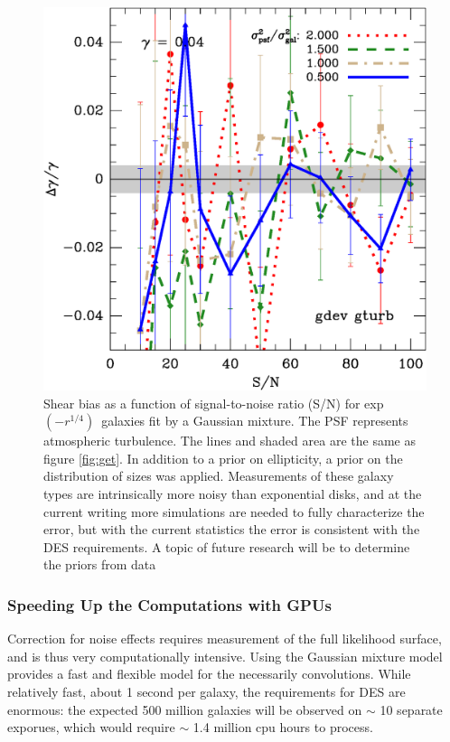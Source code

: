 \documentclass[12pt]{article}
\newcommand{\devprof}{exp$(-r^{1/4})$}
\begin{document}
\begin{figure}[p]
\centering

\includegraphics[scale=0.4]{mcbayes-gdt02r11-yr-0.050-0.050-frac.eps}
\caption{Shear bias as a function of signal-to-noise ratio (S/N) for \devprof\
galaxies fit by a Gaussian mixture.  The PSF represents atmospheric turbulence.
The lines and shaded area are the same as figure \ref{fig:get}. In addition to
a prior on ellipticity, a prior on the distribution of sizes was applied.
Measurements of these galaxy types are intrinsically more noisy than
exponential disks, and at the current writing more simulations are needed to
fully characterize the error, but with the current statistics the error is
consistent with the DES requirements.  A topic of future research will be to
determine the priors from data \label{fig:gdt}}

\end{figure}

\subsubsection{Speeding Up the Computations with GPUs} \label{sec:gmix:gpu}

Correction for noise effects requires measurement of the full likelihood
surface, and is thus very computationally intensive.  Using the Gaussian
mixture model provides a fast and flexible model for the necessarily
convolutions.   While relatively fast, about 1 second per galaxy, the
requirements for DES are enormous: the expected 500 million galaxies will be
observed on $\sim$ 10 separate exporues, which would require $\sim$ 1.4 million
cpu hours to process.
\end{document}
